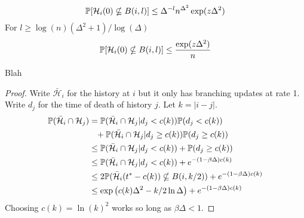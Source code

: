 \begin{corollary}
\label{cor:prob update function time 0 in B(i, l)}
	\begin{equation}
		\mathbb{P}[\mathcal{H}_i(0) \nsubseteq B(i,l)] \leq \Delta^{-l} n^{\Delta^2} \exp(z \Delta^2)
	\end{equation}
	For $l \geq \log(n)(\Delta^2 + 1)/\log(\Delta)$
	\begin{equation}
			\mathbb{P}[\mathcal{H}_i(0) \nsubseteq B(i,l)] \leq \frac{\exp(z \Delta^2)}{n}
	\end{equation}
\end{corollary}

\begin{lemma}
	Blah
\end{lemma}
\begin{proof}
	Write $\bar{\mathcal{H}}_i$ for the history at $i$ but it only has branching updates at rate 1. Write $d_j$ for the time of death of history $j$. Let $k = |i-j|$.
	\begin{align}
		\mathbb{P}(\bar{\mathcal{H}}_i \cap \mathcal{H}_j) &= \mathbb{P}(\bar{\mathcal{H}}_i \cap \mathcal{H}_j | d_j < c(k)) \mathbb{P}(d_j < c(k)) \notag \\
		&\phantom{=}+ \mathbb{P}(\bar{\mathcal{H}}_i \cap \mathcal{H}_j | d_j \geq c(k)) \mathbb{P}(d_j \geq c(k))\\
		&\leq \mathbb{P}(\bar{\mathcal{H}}_i \cap \mathcal{H}_j | d_j < c(k)) + \mathbb{P}(d_j \geq c(k))\\
		&\leq \mathbb{P}(\bar{\mathcal{H}}_i \cap \mathcal{H}_j | d_j < c(k)) + e^{-(1 - \beta \Delta) c(k)}\\
		&\leq 2\mathbb{P}(\bar{\mathcal{H}}_i(t^* - c(k)) \nsubseteq B(i, k/2)) + e^{-(1 - \beta \Delta) c(k)}\\
		&\leq \exp\left(c(k) \Delta^2 - k/2 \ln \Delta \right) + e^{-(1 - \beta \Delta) c(k)}\\
	\end{align}
	Choosing $c(k) = \ln(k)^2$ works so long as $\beta \Delta < 1$.
\end{proof}

